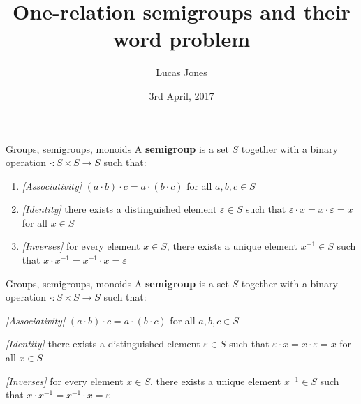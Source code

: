 \documentclass[]{beamer}
\title{One-relation semigroups and their word problem}
\author{Lucas Jones}
\date{3rd April, 2017}
\institute{University of St Andrews}
\let\epsilon\varepsilon
\begin{document}
\maketitle

\begin{frame}{Groups, semigroups, monoids}
	A \textbf{\textcolor{inactive}{semi}group} is a set $S$ together with a binary operation $\cdot \colon S \times S \to S$ such that:

	\begin{enumerate}
		\item \emph{[Associativity]} $(a \cdot b) \cdot c = a \cdot (b \cdot c)$ for all $a, b, c \in S$
		\item \emph{[Identity]} there exists a distinguished element $\epsilon \in S$ such that $\epsilon \cdot x = x \cdot \epsilon = x$ for all $x \in S$
		\item \emph{[Inverses]} for every element $x \in S$, there exists a unique element $x^{-1} \in S$ such that $x \cdot x^{-1} = x^{-1} \cdot x = \epsilon$
	\end{enumerate}

\end{frame}

\begin{frame}{Groups, semigroups, monoids}
	A \textbf{semigroup} is a set $S$ together with a binary operation $\cdot \colon S \times S \to S$ such that:

	\begin{enumerate}
		\item \emph{[Associativity]} $(a \cdot b) \cdot c = a \cdot (b \cdot c)$ for all $a, b, c \in S$
		\textcolor{inactive}{
		\item \emph{[Identity]} there exists a distinguished element $\epsilon \in S$ such that $\epsilon \cdot x = x \cdot \epsilon = x$ for all $x \in S$
		\item \emph{[Inverses]} for every element $x \in S$, there exists a unique element $x^{-1} \in S$ such that $x \cdot x^{-1} = x^{-1} \cdot x = \epsilon$
			}
	\end{enumerate}

\end{frame}
\end{document}
